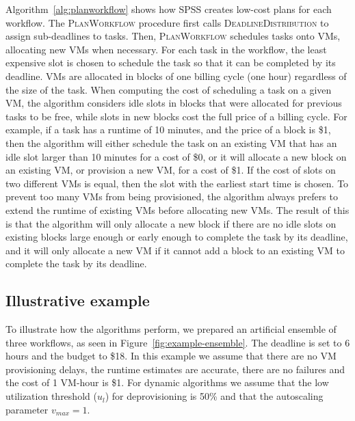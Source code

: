 \documentclass[preprint,5p]{elsarticle}
\begin{document}
Algorithm~\ref{alg:planworkflow} shows how SPSS creates low-cost plans for each
workflow. The \textsc{PlanWorkflow} procedure first calls
\textsc{DeadlineDistribution} to assign sub-deadlines to tasks.
Then, \textsc{PlanWorkflow} schedules
tasks onto VMs, allocating new VMs when necessary. For each task in the
workflow, the least expensive slot is chosen to schedule the task so that it can
be completed by  its deadline. VMs are allocated in blocks of one billing cycle
(one hour) regardless of the size of the task. When computing the cost of
scheduling a task on a given VM, the algorithm considers idle slots in blocks
that were allocated for previous tasks to be free, while slots in new blocks
cost the full price of a billing cycle. 
For example, if a task has a runtime of
10 minutes, and the price of a block is \$1, then the algorithm will either
schedule the task on an existing VM that has an idle slot larger than 10
minutes for a cost of \$0, or it will allocate a new block on an existing VM,
or provision a new VM, for a cost of \$1. 
If the cost of slots on two different
VMs is equal, then the slot with the earliest start time is chosen. To prevent too
many VMs from being provisioned, the algorithm always prefers to extend the
runtime of existing VMs before allocating new VMs. The result of this is that
the algorithm will only allocate a new block if there are no idle slots on
existing blocks large enough or early enough to complete the task by its
deadline, and it will only allocate a new VM if it cannot add a block to an
existing VM to complete the task by its deadline.



\subsection{Illustrative example}

To illustrate how the algorithms perform, we prepared an artificial ensemble 
of three workflows, as seen in Figure~\ref{fig:example-ensemble}. 
The deadline is set to 6 hours and the budget to \$18. In this example we assume
that there are no VM provisioning delays, the runtime estimates are accurate, 
there are no failures and the cost of 1 VM-hour is \$1.
For dynamic algorithms we assume that the low utilization threshold ($u_l$) for deprovisioning is 50\%
and that the autoscaling parameter $v_{max} = 1$. 
\end{document}
